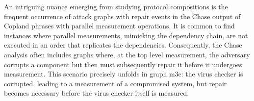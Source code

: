 \documentclass[runningheads]{llncs}
\theoremstyle{definition}
\begin{document}

An intriguing nuance emerging from studying protocol compositions is the frequent occurrence of attack graphs with repair events in the Chase output of Copland phrases with parallel measurement operations. It is common to find instances where parallel measurements, mimicking the dependency chain, are not executed in an order that replicates the dependencies. Consequently, the Chase analysis often includes graphs where, at the top level measurement, the adversary corrupts a component but then must subsequently repair it before it undergoes measurement. This scenario precisely unfolds in graph m3c: the virus checker is corrupted, leading to a measurement of a compromised system, but repair becomes necessary before the virus checker itself is measured.
\end{document}
